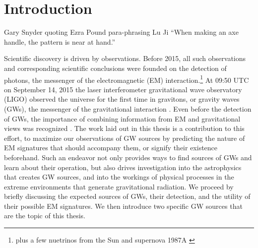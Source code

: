 \chapter[Introduction]{Introduction} \label{ch:intro}
%
%
%
%
%
%
%
\vspace{-16pt} \begin{chapquote}{Gary Snyder quoting Ezra Pound para-phrasing Lu Ji} \singlespacing ``When making an axe handle, the pattern is near at hand.'' 
 \end{chapquote} \vspace{-8pt}
\noindent\makebox[\linewidth]{\rule{0.5\textwidth}{0.5pt}} \vspace{1pt}

Scientific discovery is driven by observations. Before 2015, all such
observations and corresponding scientific conclusions were founded on the
detection of photons, the messenger of the electromagnetic (EM)
interaction.\footnote{
plus a few nuetrinos from the Sun and supernova 1987A
\citep{Haxton:SolarNeutrinos:2013, Hirata:1987, Bionta:1987, ICECUBE}
} 
At 09:50 UTC on September 14, 2015 the laser interferometer gravitational wave
observatory (LIGO) observed the universe for the first time in gravitons, or
gravity waves (GWs), the messenger of the gravitational interaction
\citep{GW150914:2016}. Even before the detection of GWs, the importance of
combining information from EM and gravitational views was recognized
\citep[\textit{e.g.}][]{ThorneBraginsky:1976,Phinney:2009}. The
work laid out in this thesis is a contribution to this effort, to maximize our
observations of GW sources by predicting the nature of EM signatures that
should accompany them, or signify their existence beforehand. Such an endeavor
not only provides ways to find sources of GWs and learn about their operation,
but also drives investigation into the astrophysics that creates GW sources,
and into the workings of physical processes in the extreme environments that
generate gravitational radiation. We proceed by briefly discussing the
expected sources of GWs, their detection, and the utility of their possible EM
signatures. We then introduce two specific GW sources that are the topic of
this thesis.



